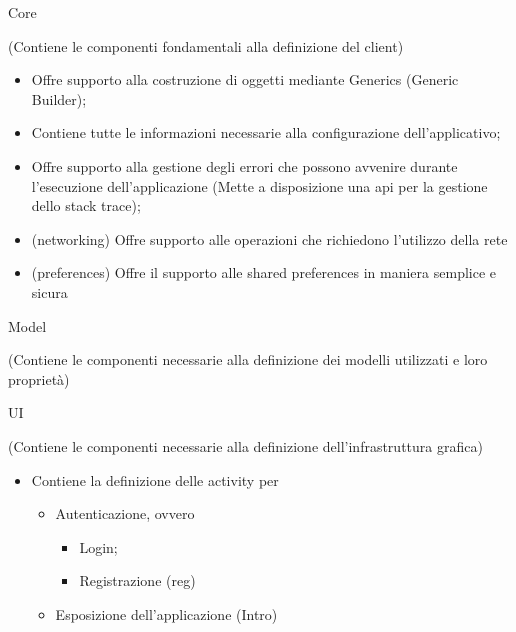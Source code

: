   \begin{minipage}{0.45\textwidth}
    \begin{center}
      {\Huge Core}

      (Contiene le componenti fondamentali alla definizione del client)
    \end{center}
    \vspace{0.5cm}

    \begin{itemize}
      \setlength\itemsep{1em}
    \item {} \rightarrow Offre supporto alla costruzione di oggetti mediante Generics (Generic Builder);
    \item {} \rightarrow Contiene tutte le informazioni necessarie alla configurazione dell'applicativo;
    \item {} \rightarrow Offre supporto alla gestione degli errori che possono avvenire durante l'esecuzione dell'applicazione (Mette a disposizione una api per la gestione dello stack trace);
    \item {} (networking) \rightarrow Offre supporto alle operazioni che richiedono l'utilizzo della rete
    \item {} (preferences) \rightarrow Offre il supporto alle shared preferences in maniera semplice e sicura
    \end{itemize}

    \vspace{1cm}

    \begin{center}
      {\Huge Model}

      (Contiene le componenti necessarie alla definizione dei modelli utilizzati e loro proprietà)
    \end{center}
    \vspace{0.5cm}

    \begin{center}
      {\Huge UI}

      (Contiene le componenti necessarie alla definizione dell’infrastruttura grafica)
    \end{center}
    \vspace{0.5cm}

    \begin{itemize}
      \setlength\itemsep{1em}
    \item {} \rightarrow Contiene la definizione delle activity \footnotemark per \begin{itemize} \item Autenticazione, ovvero \begin{itemize} \item Login; \item Registrazione (reg) \end{itemize} \item Esposizione dell'applicazione (Intro) \end{itemize}


\end{itemize}
\end{minipage}
